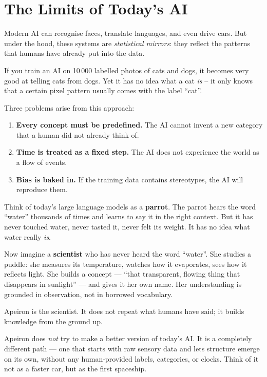 \section{The Limits of Today’s AI}
\label{sec:limits}

Modern AI can recognise faces, translate languages, and even drive cars.
But under the hood, these systems are \emph{statistical mirrors}: they
reflect the patterns that humans have already put into the data.

\begin{tcolorbox}[colback=blue!5, colframe=blue!40, title=Quick thought]
If you train an AI on 10\,000 labelled photos of cats and dogs, it
becomes very good at telling cats from dogs.  Yet it has no idea what
a cat \emph{is} – it only knows that a certain pixel pattern usually
comes with the label “cat”.
\end{tcolorbox}

Three problems arise from this approach:
\begin{enumerate}
    \item \textbf{Every concept must be predefined.}  The AI cannot invent
    a new category that a human did not already think of.
    \item \textbf{Time is treated as a fixed step.}  The AI does not
    experience the world as a flow of events.
    \item \textbf{Bias is baked in.}  If the training data contains
    stereotypes, the AI will reproduce them.
\end{enumerate}

\begin{tcolorbox}[colback=red!5, colframe=red!40, title=The Parrot and the Scientist]
Think of today’s large language models as a \textbf{parrot}.  The parrot
hears the word “water” thousands of times and learns to say it in the
right context.  But it has never touched water, never tasted it, never
felt its weight.  It has no idea what water really \emph{is}.

Now imagine a \textbf{scientist} who has never heard the word “water”.
She studies a puddle: she measures its temperature, watches how it
evaporates, sees how it reflects light.  She builds a concept —
“that transparent, flowing thing that disappears in sunlight” — and
gives it her own name.  Her understanding is grounded in observation,
not in borrowed vocabulary.

Apeiron is the scientist.  It does not repeat what humans have said;
it builds knowledge from the ground up.
\end{tcolorbox}

\begin{tcolorbox}[colback=red!5, colframe=red!40, title=Why Apeiron is fundamentally different]
Apeiron does \emph{not} try to make a better version of today’s AI.
It is a completely different path — one that starts with raw sensory
data and lets structure emerge on its own, without any human‑provided
labels, categories, or clocks.  Think of it not as a faster car, but
as the first spaceship.
\end{tcolorbox}